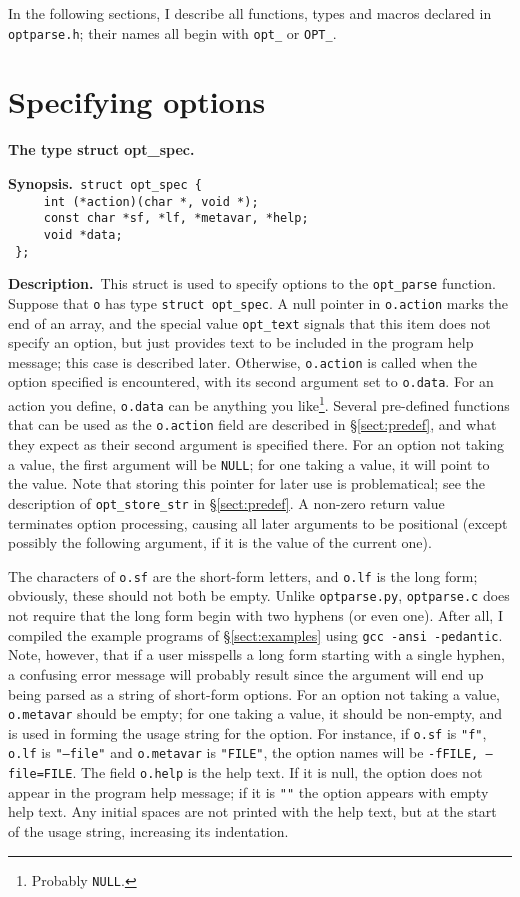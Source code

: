 \documentclass{article}
\newenvironment{chunk}[1]
{\par\smallskip\noindent\textbf{#1.}\par\nopagebreak}
{\par\smallskip}
\renewcommand{\tt}{\texttt}
\newcommand{\synopsis}{\par\noindent\textbf{Synopsis.}}
\newcommand{\synocont}{\\\phantom{\textbf{Synopsis.}}}
\newcommand{\descr}{\par\noindent\textbf{Description.}\ }
\begin{document}
In the following sections, I describe all functions, types and macros
declared in \tt{optparse.h}; their names all begin with \tt{opt\_} or
\tt{OPT\_}. 
 
\section{Specifying options}
\begin{chunk}{The type struct opt\_spec}
  \synopsis \verb+ struct opt_spec {+
  \synocont \verb+     int (*action)(char *, void *);+
  \synocont \verb+     const char *sf, *lf, *metavar, *help;+
  \synocont \verb+     void *data;+
  \synocont \verb+ };+
  \descr This struct is used to specify
  options to the \tt{opt\_parse} function. Suppose that \tt{o} has
  type \tt{struct opt\_spec}. A null pointer in \tt{o.action} marks
  the end of an array, and the special value \tt{opt\_text} signals
  that this item does not specify an option, but just provides text to
  be included in the program help message; this case is described
  later. Otherwise, \tt{o.action} is called when the option specified
  is encountered, with its second argument set to \tt{o.data}. For an
  action you define, \tt{o.data} can be anything you
  like\footnote{Probably \tt{NULL}.}. Several pre-defined functions
  that can be used as the \tt{o.action} field are described in
  \S\ref{sect:predef}, and what they expect as their second argument
  is specified there. For an option not taking a value, the first
  argument will be \tt{NULL}; for one taking a value, it will point to
  the value. Note that storing this pointer for later use is
  problematical; see the description of \tt{opt\_store\_str} in
  \S\ref{sect:predef}. A non-zero return value terminates option
  processing, causing all later arguments to be positional (except
  possibly the following argument, if it is the value of the current
  one).


  The characters of \tt{o.sf} are the short-form letters, and
  \tt{o.lf} is the long form; obviously, these should not both be
  empty. Unlike \tt{optparse.py}, \tt{optparse.c} does not require
  that the long form 
  begin with two hyphens (or even one). After all, I compiled the
  example programs of \S\ref{sect:examples} using \tt{gcc -ansi
    -pedantic}. Note, however, that if a user misspells a long form
  starting with a single hyphen, a confusing error message will
  probably result since the argument will end up being parsed as a
  string of short-form options. For an option not taking a value,
  \tt{o.metavar} should be empty; for one taking a value, it should be
  non-empty, and is used in forming the usage string for the
  option. For instance, if \tt{o.sf} is \tt{"f"}, \tt{o.lf} is
  \tt{"--file"} and \tt{o.metavar} is \tt{"FILE"}, the option names will
  be \tt{-fFILE, --file=FILE}. The field \tt{o.help} is the help
  text. If it is null, the option does not appear in the program help
  message; if it is \tt{""} the option appears with empty help text.
  Any initial spaces are not printed with the help text, but at the
  start of the usage string, increasing its indentation. 


\end{chunk}
\end{document}
